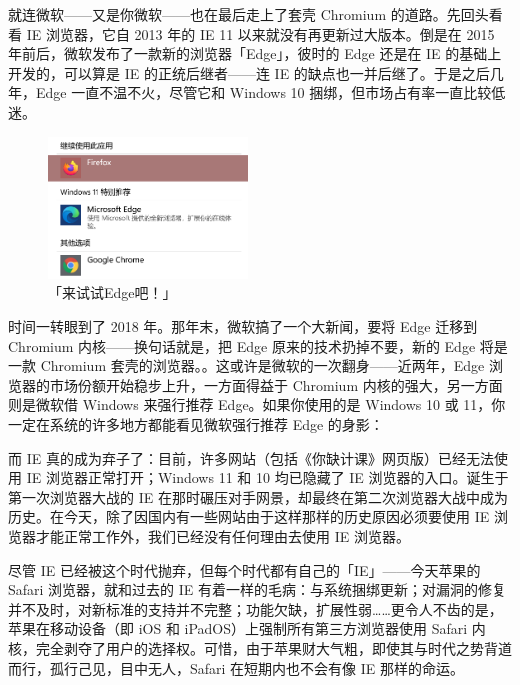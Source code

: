 就连微软——又是你微软——也在最后走上了套壳 Chromium 的道路。先回头看看 IE 浏览器，它自 2013 年的 IE 11 以来就没有再更新过大版本。倒是在 2015 年前后，微软发布了一款新的浏览器「Edge」，彼时的 Edge 还是在 IE 的基础上开发的，可以算是 IE 的正统后继者——连 IE 的缺点也一并后继了。于是之后几年，Edge 一直不温不火，尽管它和 Windows 10 捆绑，但市场占有率一直比较低迷。

\begin{figure}
  \centering
  \includegraphics[width=5.3cm]{assets/software/Windows_11_suggesting_Edge.png}
  \caption{「来试试Edge吧！」}
  \label{fig:Windows_11_suggesting_Edge}
\end{figure}

时间一转眼到了 2018 年。那年末，微软搞了一个大新闻，要将 Edge 迁移到 Chromium 内核——换句话就是，把 Edge 原来的技术扔掉不要，新的 Edge 将是一款 Chromium 套壳的浏览器。\hspace{-.5em}。这或许是微软的一次翻身——近两年，Edge 浏览器的市场份额开始稳步上升，一方面得益于 Chromium 内核的强大，另一方面则是微软借 Windows 来强行推荐 Edge。如果你使用的是 Windows 10 或 11，你一定在系统的许多地方都能看见微软强行推荐 Edge 的身影：

而 IE 真的成为弃子了：目前，许多网站（包括《你缺计课》网页版）已经无法使用 IE 浏览器正常打开；Windows 11 和 10 均已隐藏了 IE 浏览器的入口。诞生于第一次浏览器大战的 IE 在那时碾压对手网景，却最终在第二次浏览器大战中成为历史。在今天，除了因国内有一些网站由于这样那样的历史原因必须要使用 IE 浏览器才能正常工作外，我们已经没有任何理由去使用 IE 浏览器。

\begin{note}
  尽管 IE 已经被这个时代抛弃，但每个时代都有自己的「IE」——今天苹果的 Safari 浏览器，就和过去的 IE 有着一样的毛病：与系统捆绑更新；对漏洞的修复并不及时，对新标准的支持并不完整；功能欠缺，扩展性弱……更令人不齿的是，苹果在移动设备（即 iOS 和 iPadOS）上强制所有第三方浏览器使用 Safari 内核，完全剥夺了用户的选择权。可惜，由于苹果财大气粗，即使其与时代之势背道而行，孤行己见，目中无人，Safari 在短期内也不会有像 IE 那样的命运。
\end{note}

